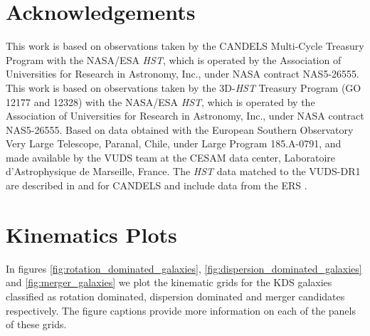 \documentclass[fleqn,usenatbib]{mn2e}
\begin{document}
\section*{Acknowledgements}

This work is based on observations taken by the CANDELS Multi-Cycle Treasury Program with the NASA/ESA {\em HST}, which is operated by the Association of Universities for Research in Astronomy, Inc., under NASA contract NAS5-26555.
This work is based on observations taken by the 3D-{\em HST} Treasury Program (GO 12177 and 12328) with the NASA/ESA {\em HST}, which is operated by the Association of Universities for Research in Astronomy, Inc., under NASA contract NAS5-26555.
Based on data obtained with the European Southern Observatory Very Large Telescope, Paranal, Chile, under Large Program 185.A-0791, and made available by the VUDS team at the CESAM data center, Laboratoire d'Astrophysique de Marseille, France.
The {\em HST} data matched to the VUDS-DR1 are described in \cite{Grogin2011} and \cite{Koekemoer2011} for CANDELS and include data from the ERS \cite{Windhorst2011}.




%


\clearpage 

%

\clearpage



\appendix

\section{Kinematics Plots}\label{app:kinematics_plots}
In figures \ref{fig:rotation_dominated_galaxies}, \ref{fig:dispersion_dominated_galaxies} and \ref{fig:merger_galaxies} we plot the kinematic grids for the KDS galaxies classified as rotation dominated, dispersion dominated and merger candidates respectively.
The figure captions provide more information on each of the panels of these grids.
\end{document}
